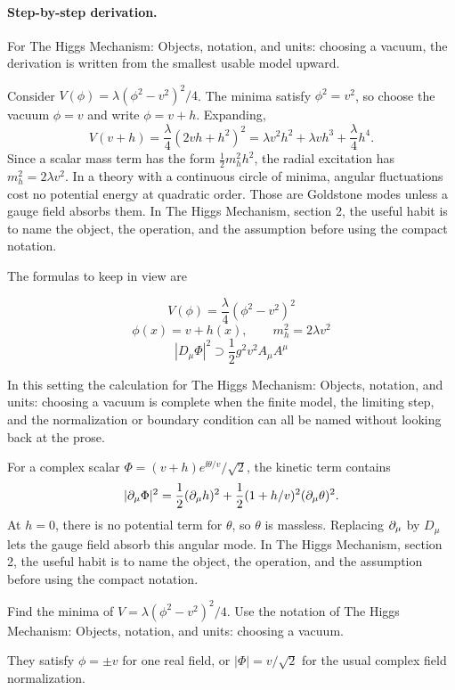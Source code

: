 \paragraph{Step-by-step derivation.}

For The Higgs Mechanism: Objects, notation, and units: choosing a vacuum, the derivation is written from the smallest usable model upward.

Consider \(V(\phi)=\lambda(\phi^2-v^2)^2/4\).  The minima satisfy \(\phi^2=v^2\), so choose the vacuum \(\phi=v\) and write \(\phi=v+h\).  Expanding,
\[
  V(v+h)=\frac{\lambda}{4}(2vh+h^2)^2
  =\lambda v^2h^2+\lambda vh^3+\frac{\lambda}{4}h^4.
\]
Since a scalar mass term has the form \(\frac12m_h^2h^2\), the radial excitation has \(m_h^2=2\lambda v^2\).  In a theory with a continuous circle of minima, angular fluctuations cost no potential energy at quadratic order.  Those are Goldstone modes unless a gauge field absorbs them.  In The Higgs Mechanism, section 2, the useful habit is to name the object, the operation, and the assumption before using the compact notation.

The formulas to keep in view are

\[
  V(\phi)=\frac{\lambda}{4}(\phi^2-v^2)^2
\]
\[
  \phi(x)=v+h(x),\qquad m_h^2=2\lambda v^2
\]
\[
  |D_\mu\Phi|^2\supset \frac12g^2v^2A_\mu A^\mu
\]

In this setting the calculation for The Higgs Mechanism: Objects, notation, and units: choosing a vacuum is complete when the finite model, the limiting step, and the normalization or boundary condition can all be named without looking back at the prose.




\begin{example}
For a complex scalar \(\Phi=(v+h)e^{\ii\theta/v}/\sqrt2\), the kinetic term contains
\[
  |\partial_\mu\Phi|^2=\frac12(\partial_\mu h)^2+\frac12(1+h/v)^2(\partial_\mu\theta)^2.
\]
At \(h=0\), there is no potential term for \(\theta\), so \(\theta\) is massless.  Replacing \(\partial_\mu\) by \(D_\mu\) lets the gauge field absorb this angular mode.  In The Higgs Mechanism, section 2, the useful habit is to name the object, the operation, and the assumption before using the compact notation.
\end{example}



\begin{exercise}
Find the minima of \(V=\lambda(\phi^2-v^2)^2/4\).  Use the notation of The Higgs Mechanism: Objects, notation, and units: choosing a vacuum.
\begin{answer}
They satisfy \(\phi=\pm v\) for one real field, or \(|\Phi|=v/\sqrt2\) for the usual complex field normalization.
\end{answer}
\end{exercise}

